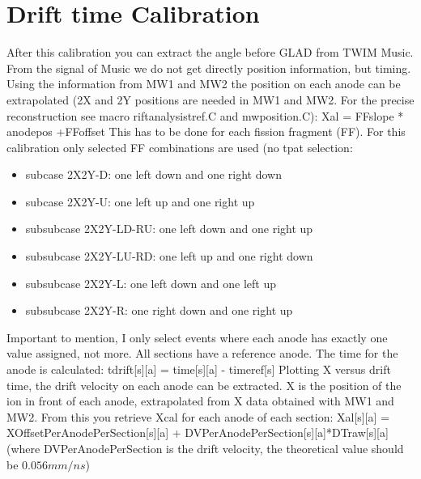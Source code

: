 \documentclass{report}
\begin{document}
\section{Drift time Calibration}
After this calibration you can extract the angle before GLAD from TWIM Music. From the signal of Music we do not get directly position information, but timing. Using the information from MW1 and MW2 the position on each anode can be extrapolated (2X and 2Y positions are needed in MW1 and MW2. For the precise reconstruction see macro rift\textunderscore analysis\textunderscore tref.C and mw\textunderscore position.C):\newline
Xal = FF\textunderscore slope * anode\textunderscore pos +FF\textunderscore offset\newline
This has to be done for each fission fragment (FF).\newline
For this calibration only selected FF combinations are used (no tpat selection:\newline
\begin{itemize}
	\item subcase 2X2Y-D: one left down and one right down
	\item subcase 2X2Y-U: one left up and one right up
	\item subsubcase 2X2Y-LD-RU: one left down and one right up
	\item subsubcase 2X2Y-LU-RD: one left up and one right down
	\item subsubcase 2X2Y-L: one left down and one left up
	\item subsubcase 2X2Y-R: one right down and one right up
\end{itemize}
Important to mention, I only select events where each anode has exactly one value assigned, not more. All sections have a reference anode. The time for the anode is calculated:\newline
t\textunderscore drift[s][a] = time[s][a] - time\textunderscore ref[s] \newline
Plotting X versus drift time, the drift velocity on each anode can be extracted. X is the position of the ion in front of each anode, extrapolated from X data obtained with MW1 and MW2.\newline
From this you retrieve Xcal for each anode of each section:\newline
Xal[s][a] = X\textunderscore OffsetPerAnodePerSection[s][a] + DV\textunderscore PerAnodePerSection[s][a]*DTraw[s][a] (where DV\textunderscore PerAnodePerSection is the drift velocity, the theoretical value should be $0.056  mm/ns $)
\end{document}

